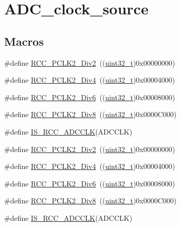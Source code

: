 \hypertarget{group___a_d_c__clock__source}{}\section{A\+D\+C\+\_\+clock\+\_\+source}
\label{group___a_d_c__clock__source}
\subsection*{Macros}
\begin{DoxyCompactItemize}
\item 
\#define \hyperlink{group___a_d_c__clock__source_ga6c341971f2f161320ad150faa3636b41}{R\+C\+C\+\_\+\+P\+C\+L\+K2\+\_\+\+Div2}~((\hyperlink{_p_e___types_8h_a33594304e786b158f3fb30289278f5af}{uint32\+\_\+t})0x00000000)
\item 
\#define \hyperlink{group___a_d_c__clock__source_gaecc7a9370fb7d7772d9c90888792084c}{R\+C\+C\+\_\+\+P\+C\+L\+K2\+\_\+\+Div4}~((\hyperlink{_p_e___types_8h_a33594304e786b158f3fb30289278f5af}{uint32\+\_\+t})0x00004000)
\item 
\#define \hyperlink{group___a_d_c__clock__source_gaffb34a845f94f4ea741a45998d28deb3}{R\+C\+C\+\_\+\+P\+C\+L\+K2\+\_\+\+Div6}~((\hyperlink{_p_e___types_8h_a33594304e786b158f3fb30289278f5af}{uint32\+\_\+t})0x00008000)
\item 
\#define \hyperlink{group___a_d_c__clock__source_ga77d5c803e2d31a806467bb7db9d24cd0}{R\+C\+C\+\_\+\+P\+C\+L\+K2\+\_\+\+Div8}~((\hyperlink{_p_e___types_8h_a33594304e786b158f3fb30289278f5af}{uint32\+\_\+t})0x0000\+C000)
\item 
\#define \hyperlink{group___a_d_c__clock__source_ga6a9c4fb239566f0f3d44c8cc266e528b}{I\+S\+\_\+\+R\+C\+C\+\_\+\+A\+D\+C\+C\+LK}(A\+D\+C\+C\+LK)
\item 
\#define \hyperlink{group___a_d_c__clock__source_ga6c341971f2f161320ad150faa3636b41}{R\+C\+C\+\_\+\+P\+C\+L\+K2\+\_\+\+Div2}~((\hyperlink{_p_e___types_8h_a33594304e786b158f3fb30289278f5af}{uint32\+\_\+t})0x00000000)
\item 
\#define \hyperlink{group___a_d_c__clock__source_gaecc7a9370fb7d7772d9c90888792084c}{R\+C\+C\+\_\+\+P\+C\+L\+K2\+\_\+\+Div4}~((\hyperlink{_p_e___types_8h_a33594304e786b158f3fb30289278f5af}{uint32\+\_\+t})0x00004000)
\item 
\#define \hyperlink{group___a_d_c__clock__source_gaffb34a845f94f4ea741a45998d28deb3}{R\+C\+C\+\_\+\+P\+C\+L\+K2\+\_\+\+Div6}~((\hyperlink{_p_e___types_8h_a33594304e786b158f3fb30289278f5af}{uint32\+\_\+t})0x00008000)
\item 
\#define \hyperlink{group___a_d_c__clock__source_ga77d5c803e2d31a806467bb7db9d24cd0}{R\+C\+C\+\_\+\+P\+C\+L\+K2\+\_\+\+Div8}~((\hyperlink{_p_e___types_8h_a33594304e786b158f3fb30289278f5af}{uint32\+\_\+t})0x0000\+C000)
\item 
\#define \hyperlink{group___a_d_c__clock__source_ga6a9c4fb239566f0f3d44c8cc266e528b}{I\+S\+\_\+\+R\+C\+C\+\_\+\+A\+D\+C\+C\+LK}(A\+D\+C\+C\+LK)
\end{DoxyCompactItemize}


